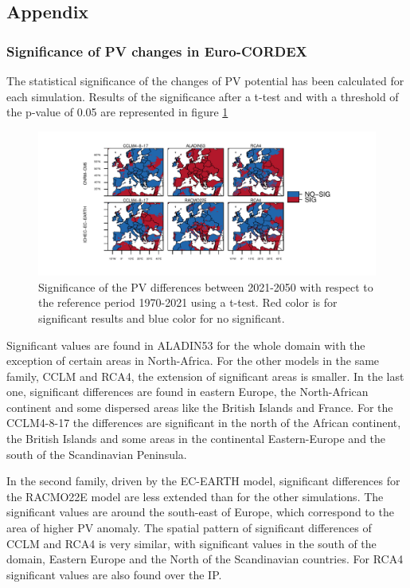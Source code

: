 \begin{subappendices}

  \section{Appendix}

\subsubsection{Significance of PV changes in Euro-CORDEX}

The statistical significance of the changes of PV potential has been calculated for each simulation. Results of the significance after a t-test and with a threshold of the p-value of 0.05 are represented in figure \ref{fig:pvalor}

\begin{figure}[h]
    \includegraphics[width=1\textwidth]{figs/capitulo7/pvalor_prueba.pdf}
    \caption[Statistical significance of PV anomalies]{Significance of the PV differences between 2021-2050 with respect to the reference period 1970-2021 using a t-test. Red color is for significant results and blue color for no significant.}
\label{fig:pvalor}
\end{figure}

Significant values are found in ALADIN53 for the whole domain with the exception of certain areas in North-Africa. For the other models in the same family, CCLM and RCA4, the extension of significant areas is smaller. In the last one, significant differences are found in eastern Europe, the North-African continent and some dispersed areas like the British Islands and France. For the CCLM4-8-17 the differences are significant in the north of the African continent, the British Islands and some areas in the continental Eastern-Europe and the south of the Scandinavian Peninsula.

In the second family, driven by the EC-EARTH model, significant differences for the RACMO22E model are less extended than for the other simulations. The significant values are around the south-east of Europe, which correspond to the area of higher PV anomaly. The spatial pattern of significant differences of CCLM and RCA4 is very similar, with significant values in the south of the domain, Eastern Europe and the North of the Scandinavian countries. For RCA4 significant values are also found over the IP. 


\end{subappendices}
